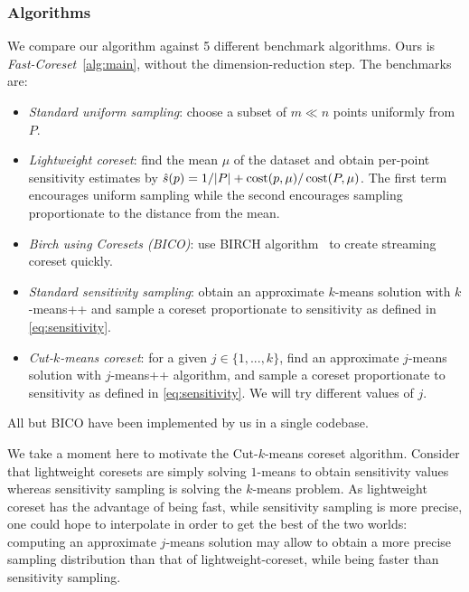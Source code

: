

\subsubsection{Algorithms}
We compare our algorithm against 5 different benchmark algorithms. Ours is \emph{Fast-Coreset}~\ref{alg:main}, without the dimension-reduction step. The benchmarks are:
\begin{itemize}
        \item \emph{Standard uniform sampling}: choose a subset of $m \ll n$ points uniformly from $P$.
        \item \emph{Lightweight coreset}: find the mean $\mu$ of the dataset and obtain per-point sensitivity estimates by $\hat{s}(p) = 1/|P| + \operatorname{cost}(p, \mu) / \operatorname{cost}(P, \mu)$.
            The first term encourages uniform sampling while the second encourages sampling proportionate to the distance from the mean.
        \item \emph{Birch using Coresets (BICO)}: use BIRCH algorithm~\cite{birch} to create streaming coreset quickly. 
        \item \emph{Standard sensitivity sampling}: obtain an approximate $k$-means solution with $k$-means++ and sample a coreset proportionate to sensitivity as defined in \cref{eq:sensitivity}.
        \item \emph{Cut-$k$-means coreset}: for a given $j \in \{1,..., k\}$, find an approximate $j$-means solution with $j$-means++ algorithm, and sample a coreset proportionate to sensitivity as defined in \cref{eq:sensitivity}. We will try different values of $j$. 
\end{itemize}
All but BICO have been implemented by us in a single codebase.

We take a moment here to motivate the Cut-$k$-means coreset algorithm.  Consider that lightweight coresets are simply solving $1$-means to obtain sensitivity values
whereas sensitivity sampling is solving the $k$-means problem. 
As lightweight coreset has the advantage of being fast, while sensitivity sampling is more precise, one could hope to interpolate in order to get the best of the two worlds: computing an approximate $j$-means solution may allow to obtain a more precise sampling distribution than that of lightweight-coreset, while being faster than sensitivity sampling.

